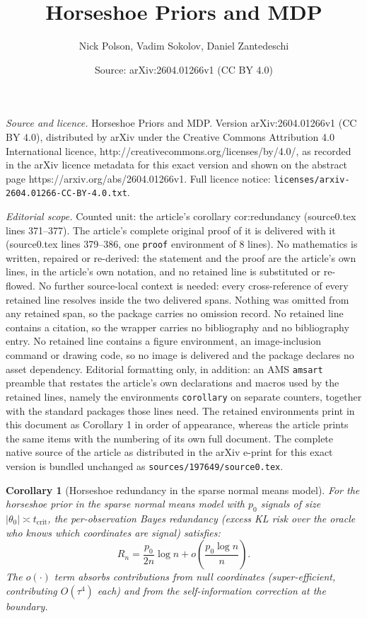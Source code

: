 \documentclass[10pt,a4paper]{amsart}
\title{Horseshoe Priors and MDP}
\author{Nick Polson, Vadim Sokolov, Daniel Zantedeschi}
\date{Source: arXiv:2604.01266v1 (CC BY 4.0)}
\newtheorem{corollary}{Corollary}
\newcommand{\abs}[1]{\lvert #1 \rvert}
\newcommand{\tcrit}{t_{\mathrm{crit}}}
\begin{document}
\maketitle

\noindent\emph{Source and licence.} Horseshoe Priors and MDP. Version arXiv:2604.01266v1 (CC BY 4.0), distributed by arXiv under the Creative Commons Attribution 4.0 International licence, http://creativecommons.org/licenses/by/4.0/, as recorded in the arXiv licence metadata for this exact version and shown on the abstract page https://arxiv.org/abs/2604.01266v1. Full licence notice: \texttt{licenses/arxiv-2604.01266-CC-BY-4.0.txt}.\par\smallskip

\noindent\textit{Editorial scope.} Counted unit: the article's corollary cor:redundancy (source0.tex lines 371--377). The article's complete original proof of it is delivered with it (source0.tex lines 379--386, one \texttt{proof} environment of 8 lines). No mathematics is written, repaired or re-derived: the statement and the proof are the article's own lines, in the article's own notation, and no retained line is substituted or re-flowed.  No further source-local context is needed: every cross-reference of every retained line resolves inside the two delivered spans.  Nothing was omitted from any retained span, so the package carries no omission record.  No retained line contains a citation, so the wrapper carries no bibliography and no bibliography entry.  No retained line contains a figure environment, an image-inclusion command or drawing code, so no image is delivered and the package declares no asset dependency.  Editorial formatting only, in addition: an AMS \texttt{amsart} preamble that restates the article's own declarations and macros used by the retained lines, namely the environments \texttt{corollary} on separate counters, together with the standard packages those lines need.  The retained environments print in this document as Corollary 1 in order of appearance, whereas the article prints the same items with the numbering of its own full document.  The complete native source of the article as distributed in the arXiv e-print for this exact version is bundled unchanged as \texttt{sources/197649/source0.tex}.
\begin{corollary}[Horseshoe redundancy in the sparse normal means model]\label{cor:redundancy}
For the horseshoe prior in the sparse normal means model with $p_0$ signals of size $\abs{\theta_0} \asymp \tcrit$, the per-observation Bayes redundancy (excess KL risk over the oracle who knows which coordinates are signal) satisfies:
\begin{equation}\label{eq:redundancy}
  R_n = \frac{p_0}{2n}\log n + o\!\left(\frac{p_0 \log n}{n}\right).
\end{equation}
The $o(\cdot)$ term absorbs contributions from null coordinates (super-efficient, contributing $O(\tau^4)$ each) and from the self-information correction at the boundary.
\end{corollary}
\end{document}
